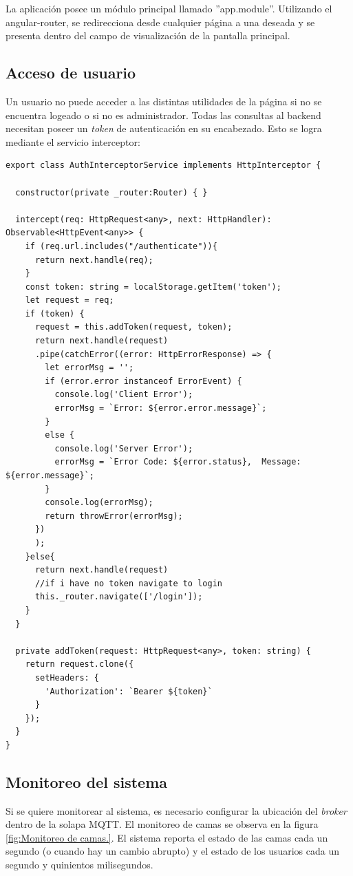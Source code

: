 La aplicación posee un módulo principal llamado ''app.module''. Utilizando el angular-router, se redirecciona desde cualquier página a una deseada y se presenta dentro del campo de visualización de la pantalla principal. 



\subsection{Acceso de usuario}

Un usuario no puede acceder a las distintas utilidades de la página si no se encuentra logeado o si no es administrador. Todas las consultas al backend necesitan poseer un \textit{token} de autenticación en su encabezado. Esto se logra mediante el servicio interceptor:


\begin{lstlisting}[label=cod:Inserción Token,caption=  Inserción de token]
export class AuthInterceptorService implements HttpInterceptor {

  constructor(private _router:Router) { }

  intercept(req: HttpRequest<any>, next: HttpHandler): Observable<HttpEvent<any>> {
    if (req.url.includes("/authenticate")){
      return next.handle(req);
    }
    const token: string = localStorage.getItem('token');
    let request = req;
	if (token) {
      request = this.addToken(request, token);
      return next.handle(request)
      .pipe(catchError((error: HttpErrorResponse) => {
        let errorMsg = '';
        if (error.error instanceof ErrorEvent) {
          console.log('Client Error');
          errorMsg = `Error: ${error.error.message}`;
        }
        else {
          console.log('Server Error');
          errorMsg = `Error Code: ${error.status},  Message: ${error.message}`;
        }
        console.log(errorMsg);
        return throwError(errorMsg);
      })
      );
    }else{
      return next.handle(request)
      //if i have no token navigate to login
      this._router.navigate(['/login']);
    }    
  }

  private addToken(request: HttpRequest<any>, token: string) {
    return request.clone({
      setHeaders: {
        'Authorization': `Bearer ${token}`
      }
    });
  }
}

\end{lstlisting}

\pagebreak

\subsection{Monitoreo del sistema}
Si se quiere monitorear al sistema, es necesario configurar la ubicación del \textit{broker} dentro de la solapa MQTT. El monitoreo de camas se observa en la figura \ref{fig:Monitoreo de camas.}. El sistema reporta el estado de las camas cada un segundo (o cuando hay un cambio abrupto) y el estado de los usuarios cada un segundo y quinientos milisegundos.

